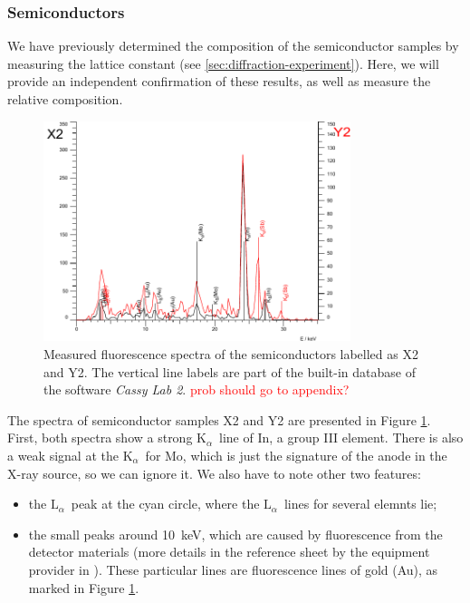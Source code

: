 \documentclass[11pt,a4paper,twoside,onecolumn]{article}
\newcommand{\reminder}[1]{\textcolor{red}{#1}}
\newcommand{\Kalpha}{$\mathrm{K}_\alpha$~}
\newcommand{\Lalpha}{$\mathrm{L}_\alpha$~}
\begin{document}
\subsubsection{Semiconductors}
We have previously determined the composition of the semiconductor samples by measuring the lattice constant (see \ref{sec:diffraction-experiment}). Here, we will provide an independent confirmation of these results, as well as measure the relative composition.
\begin{figure}[!htbp]
    \centering
    \includegraphics[width=0.8\textwidth]{img/spect-semiconductors.pdf}
    \caption{Measured fluorescence spectra of the semiconductors labelled as X2 and Y2. The vertical line labels are part of the built-in database of the software \emph{Cassy Lab 2}. \reminder{prob should go to appendix?}}
    \label{fig:spect-semiconductors}
\end{figure}

The spectra of semiconductor samples X2 and Y2 are presented in Figure \ref{fig:spect-semiconductors}. First, both spectra show a strong \Kalpha line of In, a group III element. There is also a weak signal at the \Kalpha for Mo, which is just the signature of the anode in the X-ray source, so we can ignore it. We also have to note other two features:
\vspace*{-4pt}
\begin{itemize}[noitemsep]
    \item the \Lalpha peak at the cyan circle, where the \Lalpha lines for several elemnts lie;
    \item the small peaks around \qty{10}{keV}, which are caused by fluorescence from the detector materials (more details in the reference sheet by the equipment provider in \cite{xRayManual}). These particular lines are fluorescence lines of gold (Au), as marked in Figure \ref{fig:spect-semiconductors}.
\end{itemize}
\end{document}
